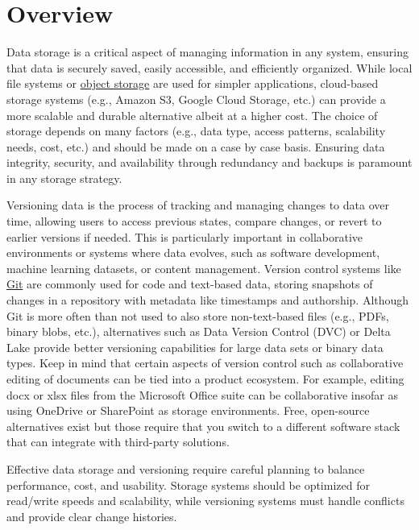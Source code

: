 \section{Overview}

Data storage is a critical aspect of managing information in any system,
ensuring that data is securely saved, easily accessible, and efficiently
organized. While local file systems or
\href{https://cloud.google.com/learn/what-is-object-storage}{object storage} are
used for simpler applications, cloud-based storage systems (e.g., Amazon S3,
Google Cloud Storage, etc.) can provide a more scalable and durable alternative
albeit at a higher cost. The choice of storage depends on many factors (e.g.,
data type, access patterns, scalability needs, cost, etc.) and should be made on
a case by case basis. Ensuring data integrity, security, and availability
through redundancy and backups is paramount in any storage strategy.

Versioning data is the process of tracking and managing changes to data over
time, allowing users to access previous states, compare changes, or revert to
earlier versions if needed. This is particularly important in collaborative
environments or systems where data evolves, such as software development,
machine learning datasets, or content management. Version control systems like
\href{https://github.com/git-guides}{Git} are commonly used for code and
text-based data, storing snapshots of changes in a repository with metadata like
timestamps and authorship. Although Git is more often than not used to also
store non-text-based files (e.g., PDFs, binary blobs, etc.), alternatives such
as Data Version Control (DVC) or Delta Lake provide better versioning
capabilities for large data sets or binary data types. Keep in mind that certain
aspects of version control such as collaborative editing of documents can be
tied into a product ecosystem. For example, editing docx or xlsx files from the
Microsoft Office suite can be collaborative insofar as using OneDrive or
SharePoint as storage environments. Free, open-source alternatives exist but
those require that you switch to a different software stack that can integrate
with third-party solutions.

Effective data storage and versioning require careful planning to balance
performance, cost, and usability. Storage systems should be optimized for
read/write speeds and scalability, while versioning systems must handle
conflicts and provide clear change histories.

